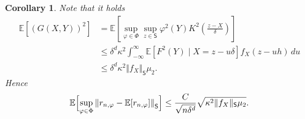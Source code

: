 \documentclass[a4paper,11pt]{amsart}
\theoremstyle{plain}
\newtheorem{corollary}[theorem]{Corollary}
\theoremstyle{remark}
\begin{document}
\begin{corollary}
\label{cor:concentr} Note that it holds
\begin{align*}
\mathbb{E}\left[  \left(  G(X,Y)\right)  ^{2}\right]   &  =\mathbb{E}\left[
\sup_{\varphi\in\Phi}\sup_{z\in \mathsf{S}}\varphi^{2}(Y)K^{2}\left(  \frac{z-X}%
{\delta}\right)  \right]  \\
&  \leq\delta^{d}\kappa^{2}\int_{-\infty}^{\infty}\mathbb{E}\left[
F^{2}(Y)\mid X=z-u\delta\right]  f_{X}(z-uh)\,du\\
&  \leq\delta^{d}\kappa^{2}\Vert f_{X}\Vert_{\mathsf{S}}\mu_{2}.
\end{align*}
Hence
\[
\mathbb{E}\Bigl[\sup_{\varphi\in\Phi}\left\Vert r_{n,\varphi}-\mathbb{E}%
[r_{n,\varphi}]\right\Vert _{\mathsf{S}}\Bigr]\leq\frac{C}{\sqrt{n\delta^{d}}}%
\sqrt{\kappa^{2}\Vert f_{X}\Vert_{\mathsf{S}}\mu_{2}}.
\]

\end{corollary}





\end{document}
